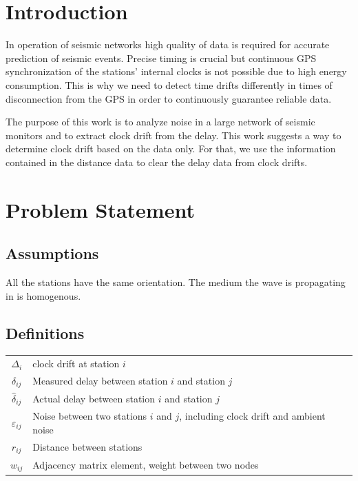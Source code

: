 \documentclass[12pt, sumlimits, intlimits]{article}
\begin{document}

\clearpage

\tableofcontents

\clearpage

\section{Introduction}

In operation of seismic networks high quality of data is required for accurate prediction of seismic events. Precise timing is crucial but continuous GPS synchronization of the stations' internal clocks is not possible due to high energy consumption. This is why we need to detect time drifts differently in times of disconnection from the GPS in order to continuously guarantee reliable data.

The purpose of this work is to analyze noise in a large network of seismic monitors and to extract clock drift from the delay.  This work suggests a way to determine clock drift based on the data only. For that, we use the information contained in the distance data to clear the delay data from clock drifts.

\section{Problem Statement}
\subsection{Assumptions}
All the stations have the same orientation.
The medium the wave is propagating in is homogenous.
\subsection{Definitions}
\begin{tabular}{c| p{11cm}}
	$\Delta_i$ & clock drift at station $i$\\
	$\delta_{ij}$ & Measured delay between station $i$ and station $j$ \\
	$\hat{\delta}_{ij}$ & Actual delay between station $i$ and station $j$ \\
	$\varepsilon_{ij}$ & Noise between two stations $i$ and $j$, including clock drift and ambient noise \\
	$r_{ij}$ & Distance between stations \\
	$w_{ij}$ & Adjacency matrix element, weight between two nodes
\end{tabular}
\end{document}
